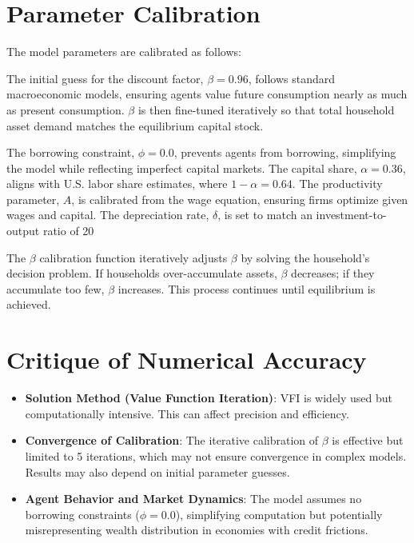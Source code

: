 \documentclass{article}
\begin{document}
\section{Parameter Calibration}

The model parameters are calibrated as follows:

The initial guess for the discount factor, $\beta = 0.96$, follows standard macroeconomic models, ensuring agents value future consumption nearly as much as present consumption. $\beta$ is then fine-tuned iteratively so that total household asset demand matches the equilibrium capital stock.

The borrowing constraint, $\phi = 0.0$, prevents agents from borrowing, simplifying the model while reflecting imperfect capital markets. The capital share, $\alpha = 0.36$, aligns with U.S. labor share estimates, where $1 - \alpha = 0.64$. The productivity parameter, $A$, is calibrated from the wage equation, ensuring firms optimize given wages and capital. The depreciation rate, $\delta$, is set to match an investment-to-output ratio of 20%

The $\beta$ calibration function iteratively adjusts $\beta$ by solving the household’s decision problem. If households over-accumulate assets, $\beta$ decreases; if they accumulate too few, $\beta$ increases. This process continues until equilibrium is achieved.


\section{Critique of Numerical Accuracy}

\begin{itemize}
    \item \textbf{Solution Method (Value Function Iteration)}: VFI is widely used but computationally intensive. This can affect precision and efficiency.  
    \item \textbf{Convergence of Calibration}: The iterative calibration of $\beta$ is effective but limited to 5 iterations, which may not ensure convergence in complex models. Results may also depend on initial parameter guesses.  
    \item \textbf{Agent Behavior and Market Dynamics}: The model assumes no borrowing constraints ($\phi = 0.0$), simplifying computation but potentially misrepresenting wealth distribution in economies with credit frictions.  
\end{itemize}
\end{document}
